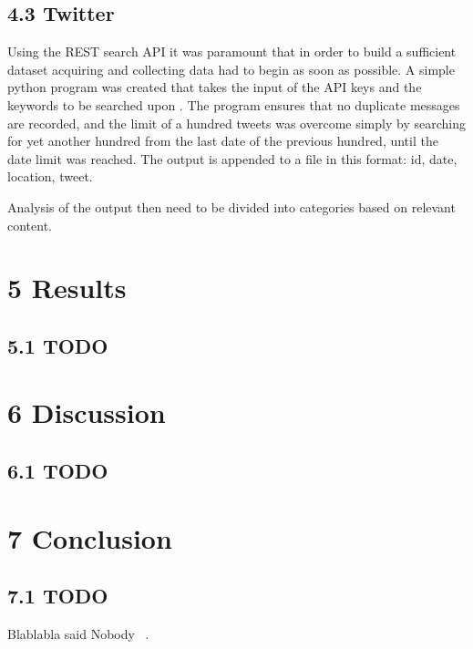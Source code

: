 \documentclass[11pt]{report}
\begin{document}
\newpage\newpage

\section*{4.3 Twitter}
Using the REST search API it was paramount that in order to build a sufficient dataset acquiring and collecting data had to begin as soon as possible. A simple python program was created that takes the input of the API keys and the keywords to be searched upon . The program ensures that no duplicate messages are recorded, and the limit of a hundred tweets was overcome simply by searching for yet another hundred from the last date of the previous hundred, until the date limit was reached.
The output is appended to a file in this format: id, date, location, tweet.

Analysis of the output then need to be divided into categories based on relevant content.

\chapter*{\vspace{-3cm}5 Results}

\section*{5.1 TODO}

\chapter*{\vspace{-3cm}6 Discussion}

\section*{6.1 TODO}

\chapter*{\vspace{-3cm}7 Conclusion}

\section*{7.1 TODO}
Blablabla said Nobody ~\cite{Nobody06}.
\end{document}
